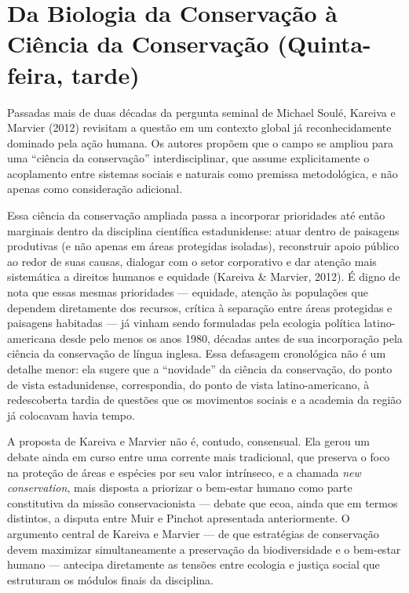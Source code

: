 \documentclass[
  portuguese,
  letterpaper,
  DIV=11,
  numbers=noendperiod]{scrartcl}
\begin{document}
\section{Da Biologia da Conservação à Ciência da Conservação
(Quinta-feira,
tarde)}\label{da-biologia-da-conservauxe7uxe3o-uxe0-ciuxeancia-da-conservauxe7uxe3o-quinta-feira-tarde}

Passadas mais de duas décadas da pergunta seminal de Michael Soulé,
Kareiva e Marvier (2012) revisitam a questão em um contexto global já
reconhecidamente dominado pela ação humana. Os autores propõem que o
campo se ampliou para uma ``ciência da conservação'' interdisciplinar,
que assume explicitamente o acoplamento entre sistemas sociais e
naturais como premissa metodológica, e não apenas como consideração
adicional.

Essa ciência da conservação ampliada passa a incorporar prioridades até
então marginais dentro da disciplina científica estadunidense: atuar
dentro de paisagens produtivas (e não apenas em áreas protegidas
isoladas), reconstruir apoio público ao redor de suas causas, dialogar
com o setor corporativo e dar atenção mais sistemática a direitos
humanos e equidade (Kareiva \& Marvier, 2012). É digno de nota que essas
mesmas prioridades --- equidade, atenção às populações que dependem
diretamente dos recursos, crítica à separação entre áreas protegidas e
paisagens habitadas --- já vinham sendo formuladas pela ecologia
política latino-americana desde pelo menos os anos 1980, décadas antes
de sua incorporação pela ciência da conservação de língua inglesa. Essa
defasagem cronológica não é um detalhe menor: ela sugere que a
``novidade'' da ciência da conservação, do ponto de vista estadunidense,
correspondia, do ponto de vista latino-americano, à redescoberta tardia
de questões que os movimentos sociais e a academia da região já
colocavam havia tempo.

A proposta de Kareiva e Marvier não é, contudo, consensual. Ela gerou um
debate ainda em curso entre uma corrente mais tradicional, que preserva
o foco na proteção de áreas e espécies por seu valor intrínseco, e a
chamada \emph{new conservation}, mais disposta a priorizar o bem-estar
humano como parte constitutiva da missão conservacionista --- debate que
ecoa, ainda que em termos distintos, a disputa entre Muir e Pinchot
apresentada anteriormente. O argumento central de Kareiva e Marvier ---
de que estratégias de conservação devem maximizar simultaneamente a
preservação da biodiversidade e o bem-estar humano --- antecipa
diretamente as tensões entre ecologia e justiça social que estruturam os
módulos finais da disciplina.
\end{document}
